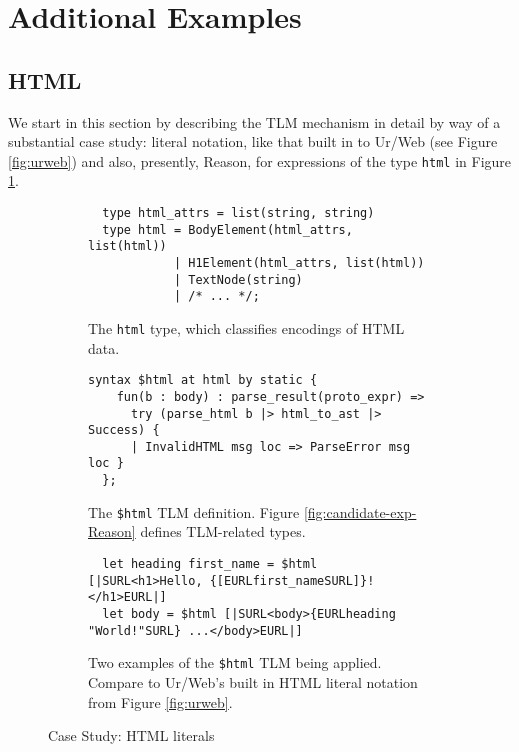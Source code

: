 \documentclass[acmsmall,review,anonymous]{acmart}\settopmatter{printfolios=true,printccs=false,printacmref=false}
\newcommand{\li}[1]{\lstinline[basicstyle=\ttfamily\fontsize{9pt}{1em}\selectfont]{#1}}
\begin{document}
\newcommand{\moreExamplesSec}{Additional Examples}
\section{\protect\moreExamplesSec}
\label{sec:more-examples}

\subsection{HTML}
We start in this section by describing the TLM mechanism in detail by way of a substantial case study: literal notation, like that built in to Ur/Web (see Figure \ref{fig:urweb}) and also, presently, Reason, for expressions of the type  \li{html} in Figure \ref{fig:html-type-def}.

\begin{figure*}[t]

\begin{subfigure}[t]{0.48\textwidth}
\begin{lstlisting}
  type html_attrs = list(string, string)
  type html = BodyElement(html_attrs, list(html))
            | H1Element(html_attrs, list(html))
            | TextNode(string) 
            | /* ... */;
\end{lstlisting}
\caption{The \li{html} type, which classifies encodings of HTML data.}
\label{fig:html-type-def}
\end{subfigure}
\hfill
\begin{subfigure}[t]{0.48\textwidth}
\begin{lstlisting}[mathescape=|]
  syntax $html at html by static {
    fun(b : body) : parse_result(proto_expr) => 
      try (parse_html b |> html_to_ast |> Success) {
      | InvalidHTML msg loc => ParseError msg loc }
  };
\end{lstlisting}
\caption{The \li{$html} TLM definition. Figure \ref{fig:candidate-exp-Reason} defines   TLM-related types.}
\label{fig:html-tlm-def}
\end{subfigure}

\begin{subfigure}[t]{\textwidth}
\begin{lstlisting}
  let heading first_name = $html [|SURL<h1>Hello, {[EURLfirst_nameSURL]}!</h1>EURL|]
  let body = $html [|SURL<body>{EURLheading "World!"SURL} ...</body>EURL|]
\end{lstlisting}
\caption{Two examples of the \li{$html} TLM being applied. Compare to Ur/Web's built in HTML literal notation from Figure \ref{fig:urweb}.  %
}
\label{fig:first-tsm-example}
\end{subfigure}
\caption{Case Study: HTML literals}
\end{figure*}
\end{document}
